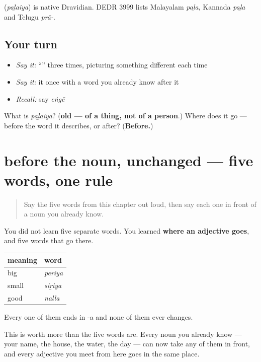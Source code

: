 \begin{cousinweb}
\textbf{} (\emph{paḻaiya}) is native Dravidian. DEDR 3999 lists Malayalam \emph{paḻa}, Kannada \emph{paḻa} and Telugu \emph{prā-}.
\end{cousinweb}

\subsection*{Your turn}
\begin{itemize}
\raggedright
  \item \emph{Say it:} \textquotedblleft{}\textquotedblright{} three times, picturing something different each time
  \item \emph{Say it:} it once with a word you already know after it
  \item \emph{Recall:} say \emph{eṅgē}
\end{itemize}

\begin{tcolorbox}[breakable,colback=teal!4,colframe=teal!35!black,title={Before you move on}]
What is \emph{paḻaiya}? (\textbf{old — of a thing, not of a person}.) Where does it go — before the word it describes, or after? (\textbf{Before.})
\end{tcolorbox}
\section[before the noun, unchanged]{before the noun, unchanged — five words, one rule}

\label{lesson:TA-C41-adjective-system}



\begin{quote}
Say the five words from this chapter out loud, then say each one in front of a noun you already know.
\end{quote}

\begin{grammarlens}[title={Grammar lens: where an adjective goes}]
You did not learn five separate words. You learned \textbf{where an adjective goes}, and five words that go there.

\noindent
\begin{tabularx}{\linewidth}{@{}>{\raggedright\arraybackslash}X>{\raggedright\arraybackslash}X@{}}
\toprule
\textbf{meaning} & \textbf{word} \\
\midrule
big & \textbf{\ta{பெரிய}} \emph{periya} \\
small & \textbf{\ta{சிறிய}} \emph{siṟiya} \\
good & \textbf{\ta{நல்ல}} \emph{nalla} \\
\bottomrule
\end{tabularx}

Every one of them ends in -a and none of them ever changes.

This is worth more than the five words are. Every noun you already know — your name, the house, the water, the day — can now take any of them in front, and every adjective you meet from here goes in the same place.
\end{grammarlens}

